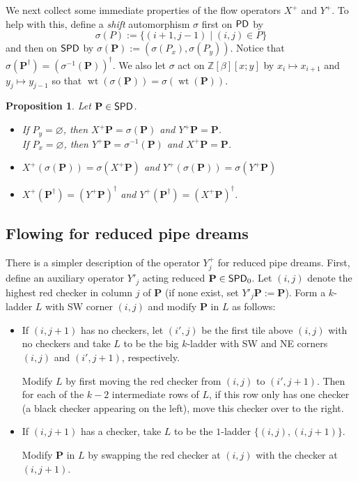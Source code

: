 \documentclass[11pt,reqno]{amsart} %
\newcommand{\bbZ}{\mathbb{Z}}
\newcommand{\bfP}{\mathbf{P}}
\DeclareMathOperator{\wt}{wt}
\DeclareMathOperator{\PD}{\sf{PD}}
\DeclareMathOperator{\SPD}{\sf{SPD}}
\newtheorem{proposition}[theorem]{Proposition}
\theoremstyle{definition}
\begin{document}
We next collect some immediate properties of the flow operators $X^+$ and $Y^+$. 
To help with this, define a \textit{shift} automorphism $\sigma$ first on $\PD$ by \[
    \sigma(P) := \{(i+1,j-1) \mid (i,j)\in P\}
\] and then on $\SPD$ by $\sigma(\bfP) := (\sigma(P_x),\sigma(P_y))$.
Notice that $\sigma(\bfP^\dagger) = (\sigma^{-1}(\bfP))^\dagger$.
We also let $\sigma$ act on $\bbZ[\beta][x;y]$ by $x_i\mapsto x_{i+1}$ and $y_j\mapsto y_{j-1}$ so that $\wt(\sigma(\bfP)) = \sigma(\wt(\bfP))$.

\begin{proposition}
\label{prop:flow properties}
Let $\bfP\in \SPD$.
\begin{itemize}
\item[(i)]
If $P_y = \varnothing$, then $X^+\bfP = \sigma(\bfP)$ and $Y^+\bfP = \bfP$. \\
If $P_x = \varnothing$, then $Y^+\bfP = \sigma^{-1}(\bfP)$ and $X^+\bfP = \bfP$.

\item[(ii)]
$X^+(\sigma(\bfP)) = \sigma(X^+\bfP)$
\quad and \quad
$Y^+(\sigma(\bfP)) = \sigma(Y^+\bfP)$

\item[(iii)]
$X^+(\bfP^\dagger) = (Y^+\bfP)^\dagger$
\quad and \quad
$Y^+(\bfP^\dagger) = (X^+\bfP)^\dagger$.
\end{itemize}
\end{proposition}






\subsection{Flowing for reduced pipe dreams}
\label{subsect:reduced flowing}

There is a simpler description of the operator $Y^+_j$ for reduced pipe dreams.
First, define an auxiliary operator $Y'_j$ acting reduced $\bfP\in \SPD_0$. 
Let $(i,j)$ denote the highest red checker in column $j$ of $\bfP$ (if none exist, set $Y'_j\bfP := \bfP$).
Form a $k$-ladder $L$ with SW corner $(i,j)$ and modify $\bfP$ in $L$ as follows:
\begin{itemize}
    \item[$\lozenge$]
    If $(i,j+1)$ has no checkers, let $(i',j)$ be the first tile above $(i,j)$ with no checkers and take $L$ to be the big $k$-ladder with SW and NE corners $(i,j)$ and $(i',j+1)$, respectively.
    
    Modify $L$ by first moving the red checker from $(i,j)$ to $(i',j+1)$.
    Then for each of the $k-2$ intermediate rows of $L$, if this row only has one checker (a black checker appearing on the left), move this checker over to the right.
    
    \item[$\blacklozenge$]
    If $(i,j+1)$ has a checker, take $L$ to be the $1$-ladder $\{(i,j),(i,j+1)\}$.
    
    Modify $\bfP$ in $L$ by swapping the red checker at $(i,j)$ with the checker at $(i,j+1)$.
\end{itemize}
\end{document}
